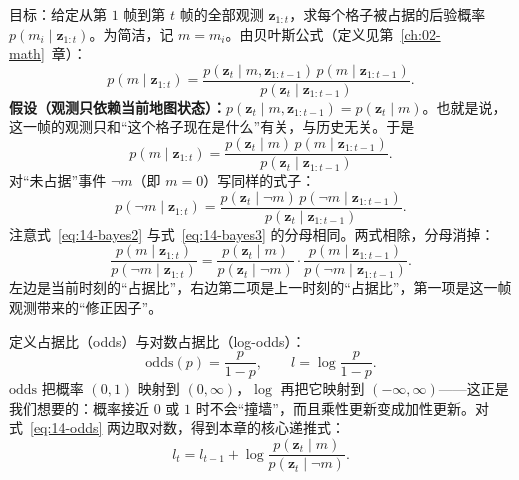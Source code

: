 目标：给定从第 $1$ 帧到第 $t$ 帧的全部观测 $\bm{z}_{1:t}$，求每个格子被占据的后验概率 $p(m_i\mid \bm{z}_{1:t})$。为简洁，记 $m=m_i$。由贝叶斯公式（定义见第~\ref{ch:02-math}~章）：
\begin{equation}
p(m\mid \bm{z}_{1:t})=\frac{p(\bm{z}_t\mid m,\bm{z}_{1:t-1})\,p(m\mid \bm{z}_{1:t-1})}{p(\bm{z}_t\mid \bm{z}_{1:t-1})}.
\label{eq:14-bayes1}
\end{equation}
\textbf{假设（观测只依赖当前地图状态）：}$p(\bm{z}_t\mid m,\bm{z}_{1:t-1})=p(\bm{z}_t\mid m)$。也就是说，这一帧的观测只和``这个格子现在是什么''有关，与历史无关。于是
\begin{equation}
p(m\mid \bm{z}_{1:t})=\frac{p(\bm{z}_t\mid m)\,p(m\mid \bm{z}_{1:t-1})}{p(\bm{z}_t\mid \bm{z}_{1:t-1})}.
\label{eq:14-bayes2}
\end{equation}
对``未占据''事件 $\neg m$（即 $m=0$）写同样的式子：
\begin{equation}
p(\neg m\mid \bm{z}_{1:t})=\frac{p(\bm{z}_t\mid \neg m)\,p(\neg m\mid \bm{z}_{1:t-1})}{p(\bm{z}_t\mid \bm{z}_{1:t-1})}.
\label{eq:14-bayes3}
\end{equation}
注意式~\eqref{eq:14-bayes2} 与式~\eqref{eq:14-bayes3} 的分母相同。两式相除，分母消掉：
\begin{equation}
\frac{p(m\mid \bm{z}_{1:t})}{p(\neg m\mid \bm{z}_{1:t})}
=
\frac{p(\bm{z}_t\mid m)}{p(\bm{z}_t\mid\neg m)}
\cdot
\frac{p(m\mid \bm{z}_{1:t-1})}{p(\neg m\mid \bm{z}_{1:t-1})}.
\label{eq:14-odds}
\end{equation}
左边是当前时刻的``占据比''，右边第二项是上一时刻的``占据比''，第一项是这一帧观测带来的``修正因子''。

定义占据比（odds）与对数占据比（log-odds）：
\begin{equation}
\mathrm{odds}(p)=\frac{p}{1-p},
\qquad
l=\log\frac{p}{1-p}.
\label{eq:14-logodds-def}
\end{equation}
$\mathrm{odds}$ 把概率 $(0,1)$ 映射到 $(0,\infty)$，$\log$ 再把它映射到 $(-\infty,\infty)$——这正是我们想要的：概率接近 $0$ 或 $1$ 时不会``撞墙''，而且乘性更新变成加性更新。对式~\eqref{eq:14-odds} 两边取对数，得到本章的核心递推式：
\begin{equation}
l_t=l_{t-1}+\log\frac{p(\bm{z}_t\mid m)}{p(\bm{z}_t\mid\neg m)}.
\label{eq:14-logodds-recursion}
\end{equation}

